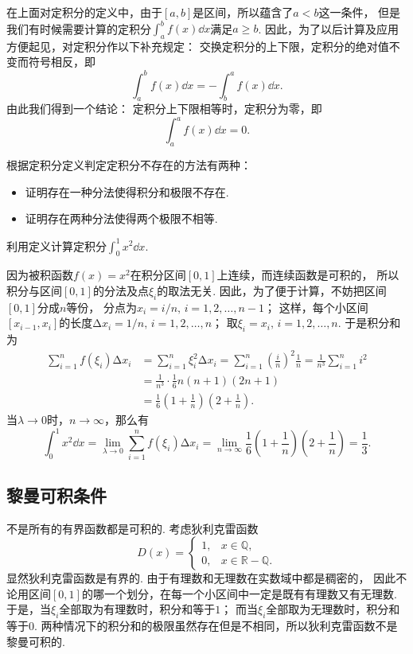在上面对定积分的定义中，由于\([a,b]\)是区间，所以蕴含了\(a<b\)这一条件，
但是我们有时候需要计算的定积分\(\int_a^b f(x) \dd{x}\)满足\(a \geq b\).
因此，为了以后计算及应用方便起见，对定积分作以下补充规定：
交换定积分的上下限，定积分的绝对值不变而符号相反，即
\begin{equation}\label{equation:定积分.交换上下限改变定积分的符号}
	\int_a^b f(x) \dd{x}
	= - \int_b^a f(x) \dd{x}.
\end{equation}
由此我们得到一个结论：
定积分上下限相等时，定积分为零，即
\begin{equation}\label{equation:定积分.上下限相等的定积分为零}
    \int_a^a f(x) \dd{x} = 0.
\end{equation}

根据定积分定义判定定积分不存在的方法有两种：
\begin{itemize}
	\item 证明存在一种分法使得积分和极限不存在.
	\item 证明存在两种分法使得两个极限不相等.
\end{itemize}

\begin{example}
利用定义计算定积分\(\int_0^1 x^2 \dd{x}\).
\begin{solution}
因为被积函数\(f(x) = x^2\)在积分区间\([0,1]\)上连续，而连续函数是可积的，
所以积分与区间\([0,1]\)的分法及点\(\xi_i\)的取法无关.
因此，为了便于计算，不妨把区间\([0,1]\)分成\(n\)等份，
分点为\(x_i = i/n,\,i=1,2,\dotsc,n-1\)；
这样，每个小区间\([x_{i-1},x_i]\)的长度\(\increment x_i = 1/n,\,i=1,2,\dotsc,n\)；
取\(\xi_i=x_i,\,i=1,2,\dotsc,n\).
于是积分和为\begin{align*}
	\sum_{i=1}^n f(\xi_i) \increment x_i
	&= \sum_{i=1}^n \xi_i^2 \increment x_i
	= \sum_{i=1}^n \left(\frac{i}{n}\right)^2 \frac{1}{n}
	= \frac{1}{n^3} \sum_{i=1}^n i^2 \\
	&= \frac{1}{n^3} \cdot \frac{1}{6} n(n+1)(2n+1) \\
	&= \frac{1}{6} \left(1+\frac{1}{n}\right) \left(2+\frac{1}{n}\right).
\end{align*}
当\(\lambda\to0\)时，\(n\to\infty\)，那么有\[
	\int_0^1 x^2 \dd{x}
	= \lim_{\lambda\to0} \sum_{i=1}^n f(\xi_i) \increment x_i
	= \lim_{n\to\infty}
		\frac{1}{6} \left(1+\frac{1}{n}\right) \left(2+\frac{1}{n}\right)
	= \frac{1}{3}.
\]
\end{solution}
\end{example}

\subsection{黎曼可积条件}
不是所有的有界函数都是可积的.
考虑狄利克雷函数\[
	D(x) = \left\{ \begin{array}{ll}
		1, & x \in \mathbb{Q}, \\
		0, & x \in \mathbb{R}-\mathbb{Q}.
	\end{array} \right.
\]
显然狄利克雷函数是有界的.
由于有理数和无理数在实数域中都是稠密的，
因此不论用区间\([0,1]\)的哪一个划分，在每一个小区间中一定是既有有理数又有无理数.
于是，当\(\xi_i\)全部取为有理数时，积分和等于\(1\)；
而当\(\xi_i\)全部取为无理数时，积分和等于\(0\).
两种情况下的积分和的极限虽然存在但是不相同，所以狄利克雷函数不是黎曼可积的.

